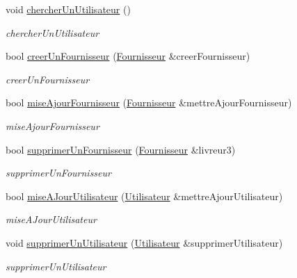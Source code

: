 \begin{DoxyCompactItemize}
\mbox{\label{class_base_de_donnees_a9b8f8d9aca5ac268cba19329e3264c01}} 
void \mbox{\hyperlink{class_base_de_donnees_a9b8f8d9aca5ac268cba19329e3264c01}{chercher\+Un\+Utilisateur}} ()
\begin{DoxyCompactList}\small\item\em chercher\+Un\+Utilisateur \end{DoxyCompactList}\item 
bool \mbox{\hyperlink{class_base_de_donnees_a81715fc3632e6533d9c66a66c62e897b}{creer\+Un\+Fournisseur}} (\mbox{\hyperlink{class_fournisseur}{Fournisseur}} \&creer\+Fournisseur)
\begin{DoxyCompactList}\small\item\em creer\+Un\+Fournisseur \end{DoxyCompactList}\item 
bool \mbox{\hyperlink{class_base_de_donnees_ab49e6dfff0eecf616d9a7642ea358f31}{mise\+Ajour\+Fournisseur}} (\mbox{\hyperlink{class_fournisseur}{Fournisseur}} \&mettre\+Ajour\+Fournisseur)
\begin{DoxyCompactList}\small\item\em mise\+Ajour\+Fournisseur \end{DoxyCompactList}\item 
bool \mbox{\hyperlink{class_base_de_donnees_a90ac8e5f412153ce4ab5a4c7a603f5e9}{supprimer\+Un\+Fournisseur}} (\mbox{\hyperlink{class_fournisseur}{Fournisseur}} \&livreur3)
\begin{DoxyCompactList}\small\item\em supprimer\+Un\+Fournisseur \end{DoxyCompactList}\item 
bool \mbox{\hyperlink{class_base_de_donnees_a9c2bce97f39046e66b3dd3d08c2b911a}{mise\+A\+Jour\+Utilisateur}} (\mbox{\hyperlink{class_utilisateur}{Utilisateur}} \&mettre\+Ajour\+Utilisateur)
\begin{DoxyCompactList}\small\item\em mise\+A\+Jour\+Utilisateur \end{DoxyCompactList}\item 
void \mbox{\hyperlink{class_base_de_donnees_a7ead23bc4e5d3bc897d9c6a412bbc0a6}{supprimer\+Un\+Utilisateur}} (\mbox{\hyperlink{class_utilisateur}{Utilisateur}} \&supprimer\+Utilisateur)
\begin{DoxyCompactList}\small\item\em supprimer\+Un\+Utilisateur \end{DoxyCompactList}\item 

\end{DoxyCompactItemize}
